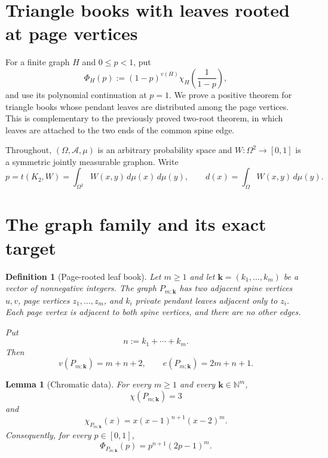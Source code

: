 \documentclass[11pt]{article}
\newtheorem{lemma}[theorem]{Lemma}
\newtheorem{definition}[theorem]{Definition}
\newcommand{\dd}{\,d}
\begin{document}
\section{Triangle books with leaves rooted at page vertices}

For a finite graph $H$ and $0\leq p<1$, put
\[
 \Phi_H(p)
 :=(1-p)^{v(H)}
 \chi_H\!\left(\frac{1}{1-p}\right),
\]
and use its polynomial continuation at $p=1$.  We prove a positive
theorem for triangle books whose pendant leaves are distributed among
the page vertices.  This is complementary to the previously proved
two-root theorem, in which leaves are attached to the two ends of the
common spine edge.

Throughout, $(\Omega,\mathcal A,\mu)$ is an arbitrary probability
space and $W:\Omega^2\to[0,1]$ is a symmetric jointly measurable
graphon.  Write
\[
 p=t(K_2,W)=\int_{\Omega^2}W(x,y)\dd\mu(x)\dd\mu(y),
 \qquad
 d(x)=\int_\Omega W(x,y)\dd\mu(y).
\]


\section{The graph family and its exact target}

\begin{definition}[Page-rooted leaf book]\label{def:family}
Let $m\geq1$ and let $\mathbf{k}=(k_1,\ldots,k_m)$ be a vector of
nonnegative integers.  The graph $P_{m;\mathbf{k}}$ has two adjacent
\emph{spine vertices} $u,v$, page vertices $z_1,\ldots,z_m$, and
$k_i$ private pendant leaves adjacent only to $z_i$.  Each page vertex
is adjacent to both spine vertices, and there are no other edges.

Put
\[
 n:=k_1+\cdots+k_m.
\]
Then
\[
 v(P_{m;\mathbf{k}})=m+n+2,
 \qquad
 e(P_{m;\mathbf{k}})=2m+n+1.
\]
\end{definition}

\begin{lemma}[Chromatic data]\label{lem:chromatic}
For every $m\geq1$ and every $\mathbf{k}\in\mathbb N^m$,
\[
 \chi(P_{m;\mathbf{k}})=3
\]
and
\begin{equation}
 \chi_{P_{m;\mathbf{k}}}(x)
 =x(x-1)^{n+1}(x-2)^m.
 \label{eq:chromatic}
\end{equation}
Consequently, for every $p\in[0,1]$,
\begin{equation}
 \Phi_{P_{m;\mathbf{k}}}(p)
 =p^{n+1}(2p-1)^m.
 \label{eq:target}
\end{equation}
\end{lemma}
\end{document}
